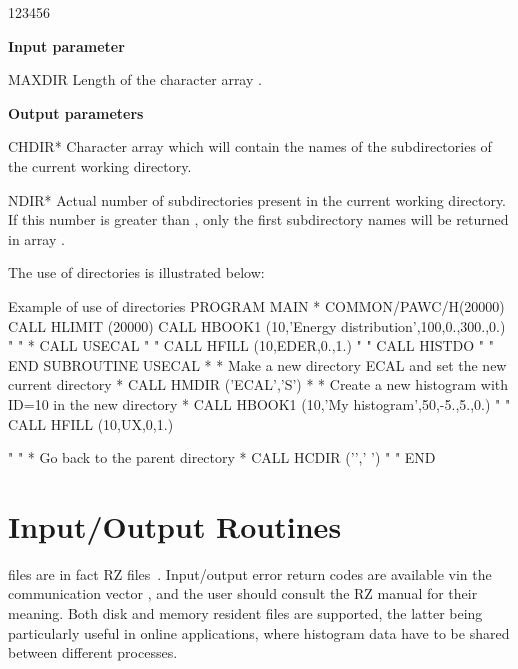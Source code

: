 \begin{DLtt}{123456}
\item[{\rm\bf Input parameter}]
\item[MAXDIR] Length of the character array .
\item[{\rm\bf Output parameters}]
\item[CHDIR*] Character array which will contain the names
of the subdirectories of the current working directory.
\item[NDIR*]
Actual number of subdirectories present in the current working directory.
If this number is greater than , only the first
 subdirectory names will be returned in array .
\end{DLtt}
 
The use of directories is illustrated below:
\begin{XMPt}{Example of use of directories}
      PROGRAM MAIN
*
      COMMON/PAWC/H(20000)
      CALL HLIMIT (20000)
      CALL HBOOK1 (10,'Energy distribution',100,0.,300.,0.)
           "   "
*
      CALL USECAL
           "   "
      CALL HFILL (10,EDER,0.,1.)
           "   "
      CALL HISTDO
           "   "
      END
      SUBROUTINE USECAL
*
*        Make a new directory ECAL and set the new current directory
*
          CALL HMDIR ('ECAL','S')
*
*        Create a new histogram with ID=10 in the new directory
*
          CALL HBOOK1 (10,'My histogram',50,-5.,5.,0.)
           "   "
          CALL HFILL (10,UX,0,1.)
 
           "   "
*         Go back to the parent directory
*
          CALL HCDIR ('\bs','  ')
           "   "
      END
\end{XMPt}

\finalnewpage%

\section{Input/Output Routines}
\label{HINOUTPU}
 
\HBOOK{} files are in fact \ZEBRA{} RZ files~\cite{bib-ZEBRA}.
%
%
Input/output error return codes are available
vin the \ZEBRA{} communication vector ,
and the user should consult the RZ manual for their meaning.
Both disk and memory resident files are supported, the latter being
particularly useful in online applications,
where histogram data have to be shared between different processes.
 
